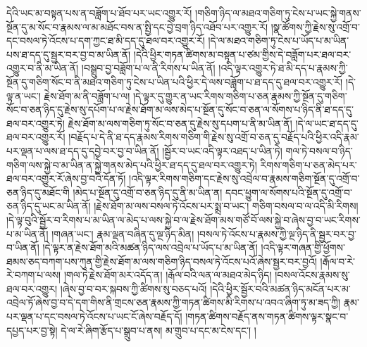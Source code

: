 དེའི་ཡང་མ་བསྟན་པས་ན་བཟློག་པ་ཐོབ་པར་ཡང་འགྱུར་རོ། །གཅིག་ཉིད་ལ་མཐའ་གཅིག་ཏུ་ངེས་པ་ཡང་སྐྱེ་གནས་སྔོན་དུ་མ་སོང་བ་རྣམས་ལ་མ་མཐོང་བས་ན་སྤྱི་དང་བྱེ་བྲག་ཉིད་འཐོབ་པར་འགྱུར་རོ། །སྣ་ཚོགས་ཀྱི་རྗེས་སུ་འགྲོ་བ་དང་བསལ་ཏེ་འོངས་པ་དག་ཀྱང་ཐ་མི་དད་དུ་ཐལ་བར་འགྱུར་རོ། །དེ་ལ་མཐའ་གཅིག་ཏུ་ངེས་པ་ཡོད་པ་མ་ཡིན་པས་ཐ་དད་དུ་སྦྱར་བར་བྱ་བ་མ་ཡིན་ནོ། །དེའི་ཕྱིར་གཏན་ཚིགས་མ་བསྟན་པ་ཙམ་གྱིས་དེ་བཟློག་པར་ཐལ་བར་འགྱུར་བ་ནི་མ་ཡིན་ནོ། །བསྒྲུབ་བྱ་བཟློག་པ་ལ་ནི་རིགས་པ་ཡིན་ནོ། །འདི་ལྟར་འགྱུར་ཏེ་ཐ་མི་དད་པ་རྣམས་ཀྱི་སྔོན་དུ་གཅིག་སོང་བ་ནི་མཐའ་གཅིག་ཏུ་ངེས་པ་ཡིན་པའི་ཕྱིར་དེ་ལས་བཟློག་པ་ཐ་དད་དུ་ཐལ་བར་འགྱུར་རོ། །དེ་ལྟ་ན་ཡང་། རྗེས་ཐོག་མ་ནི་བཟློག་པ་ལ། །དེ་ལྟར་དུ་གྱུར་ན་ཡང་རིགས་གཅིག་པ་ཅན་རྣམས་ཀྱི་སྔོན་དུ་གཅིག་སོང་བ་ཅན་ཉིད་དུ་རྗེས་སུ་དཔོག་པ་ལ་རྗེས་ཐོག་མ་ལས་མེད་པ་སྔོན་དུ་སོང་བ་ཅན་ལ་སོགས་པ་ཉིད་ནི་ཐ་དད་དུ་ཐལ་བར་འགྱུར་ཏེ། རྗེས་ཐོག་མ་ལས་གཅིག་ཏུ་སོང་བ་ཅན་དུ་རྗེས་སུ་དཔག་པ་ནི་མ་ཡིན་ནོ། །དེ་ལ་ཡང་ཐ་དད་དུ་ཐལ་བར་འགྱུར་རོ། །བརྗོད་པ་དེ་ནི་ཐ་དད་རྣམས་རིགས་གཅིག་གི་རྗེས་སུ་འགྲོ་བ་ཅན་དུ་བརྗོད་པའི་ཕྱིར་འདི་རྣམ་པར་ལྡན་པ་ལས་ཐ་དད་དུ་དབྱེ་བར་བྱ་བ་ཡིན་ནོ། །སྦྱོར་བ་ཡང་འདི་ལྟར་འཐད་པ་ཡིན་ཏེ། གལ་ཏེ་བསལ་བ་ཉིད་གཅིག་ལས་སྐྱེ་བ་མ་ཡིན་ན་སྐྱེ་གནས་མེད་པའི་ཕྱིར་ཐ་དད་དུ་ཐལ་བར་འགྱུར་ཏེ། རིགས་གཅིག་པ་ཅན་མེད་པར་ཐལ་བར་འགྱུར་རོ་ཞེས་བྱ་བའི་དོན་ཏོ། །འདི་ལྟར་རིགས་གཅིག་དང་རྗེས་སུ་འབྲེལ་བ་རྣམས་གཅིག་སྔོན་དུ་འགྲོ་བ་ཅན་ཉིད་དུ་མཐོང་གི །མེད་པ་སྔོན་དུ་འགྲོ་བ་ཅན་ཉིད་དུ་ནི་མ་ཡིན་ན། དབང་ཕྱུག་ལ་སོགས་པའི་སྔོན་དུ་འགྲོ་བ་ཅན་ཉིད་དུ་ཡང་མ་ཡིན་ནོ། །རྗེས་ཐོག་མ་ལས་བསལ་ཏེ་འོངས་པར་སྨྲ་བ་ཡང་། གཅིག་བསལ་བ་ལ་འདི་མི་རིགས། །དེ་ལྟ་བུའི་སྦྱོར་བ་རིགས་པ་མ་ཡིན་ལ་མེད་པ་ལས་སྐྱེ་བ་ལ་རྗེས་ཐོག་མས་གཙོ་བོ་ལས་སྐྱེ་བ་ཞེས་བྱ་བ་ཡང་རིགས་པ་མ་ཡིན་ནོ། །གཞན་ཡང་། རྣམ་ལྡན་བཞིན་དུ་ལྔ་ཉིད་མིན། །བསལ་ཏེ་འོངས་པ་རྣམས་ཀྱི་ལྔ་ཉིད་ནི་སྦྱར་བར་བྱ་བ་ཡིན་ནོ། །དེ་ལྟར་ན་རྗེས་ཐོག་མའི་མཚན་ཉིད་ལས་འབྲེལ་པ་ཡོད་པ་མ་ཡིན་ནོ། །འདི་ལྟར་གཞན་གྱི་ཕྱོགས་ཐམས་ཅད་བཀག་པས་ཀུན་གྱི་རྗེས་ཐོག་མ་ལས་གཅིག་ཉིད་བསལ་ཏེ་འོངས་པའོ་ཞེས་སྦྱར་བར་བྱའོ། །རྒོལ་བ་རེ་རེ་བཀག་པ་ལས། །གལ་ཏེ་རྗེས་ཐོག་མར་འདོད་ན། །རྒོལ་བའི་ལན་ལ་མཐའ་མེད་ཉིད། །བསལ་འོངས་རྣམས་སུ་ཐལ་བར་འགྱུར། །ཞེས་བྱ་བ་བར་སྐབས་ཀྱི་ཚིགས་སུ་བཅད་པའོ། །དེའི་ཕྱིར་སྦྱོར་བའི་མཚན་ཉིད་མངོན་པར་མ་འབྲེལ་ཏོ་ཞེས་བྱ་བ་དེ་དག་གིས་ནི་གྲངས་ཅན་རྣམས་ཀྱི་གཏན་ཚིགས་མི་རིགས་པ་འབའ་ཞིག་ཏུ་མ་ཟད་ཀྱི། རྣམ་པར་ལྡན་པ་དང་བསལ་ཏེ་འོངས་པ་ཡང་ངོ་ཞེས་བརྗོད་དོ། །གཏན་ཚིགས་བརྗོད་ནས་གཏན་ཚིགས་ལྟར་སྣང་བ་དཔྱད་པར་བྱ་སྟེ། དེ་ལ་རེ་ཞིག་རྩོད་པ་སྒྲུབ་པ་ནས། མ་གྲུབ་པ་དང་མ་ངེས་དང་། །
